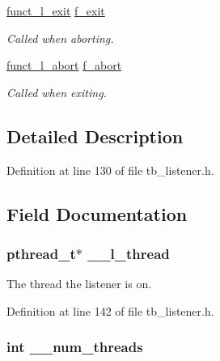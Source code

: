 \begin{DoxyCompactItemize}
\hyperlink{tb__listener_8h_a087aa7eae6394f6a052ea86a8944b262}{funct\-\_\-l\-\_\-exit} \hyperlink{structtb__listener__t_a90a87c6e5bc8d9e690190da6d0aa926e}{f\-\_\-exit}
\begin{DoxyCompactList}\small\item\em Called when aborting. \end{DoxyCompactList}\item 
\hyperlink{tb__listener_8h_a26990e2906e18234aa32e757383e1752}{funct\-\_\-l\-\_\-abort} \hyperlink{structtb__listener__t_a385e4cbcf683dd35d7d80c9726c8c67d}{f\-\_\-abort}
\begin{DoxyCompactList}\small\item\em Called when exiting. \end{DoxyCompactList}\end{DoxyCompactItemize}


\subsection{Detailed Description}


Definition at line 130 of file tb\-\_\-listener.\-h.



\subsection{Field Documentation}
\hypertarget{structtb__listener__t_a104cf2a79e8cb03fe3c0d3301fe8257f}{
\subsubsection[{\-\_\-\-\_\-l\-\_\-thread}]{\setlength{\rightskip}{0pt plus 5cm}pthread\-\_\-t$\ast$ \-\_\-\-\_\-l\-\_\-thread}}\label{structtb__listener__t_a104cf2a79e8cb03fe3c0d3301fe8257f}


The thread the listener is on. 



Definition at line 142 of file tb\-\_\-listener.\-h.

\hypertarget{structtb__listener__t_a49ffb28f94389b1ca495a663507db665}{
\subsubsection[{\-\_\-\-\_\-num\-\_\-threads}]{\setlength{\rightskip}{0pt plus 5cm}int \-\_\-\-\_\-num\-\_\-threads}}\label{structtb__listener__t_a49ffb28f94389b1ca495a663507db665}


